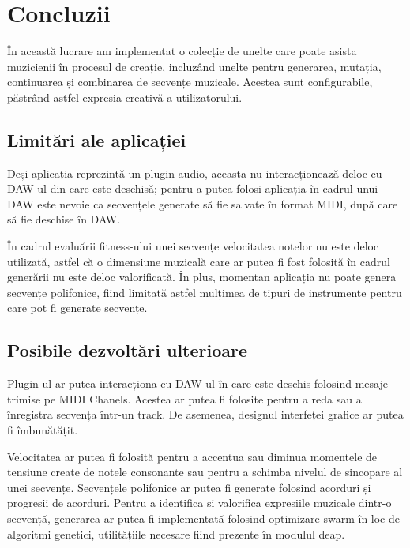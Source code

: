 \section{Concluzii}
\noindent În această lucrare am implementat o colecție de unelte care poate asista muzicienii în procesul de creație, incluzând unelte pentru generarea, mutația, continuarea și combinarea de secvențe muzicale. Acestea sunt configurabile, păstrând astfel expresia creativă a utilizatorului. 
\subsection{Limitări ale aplicației}
\noindent Deși aplicația reprezintă un plugin audio, aceasta nu interacționează deloc cu DAW-ul din care este deschisă; pentru a putea folosi aplicația în cadrul unui DAW este nevoie ca secvențele generate să fie salvate în format MIDI, după care să fie deschise în DAW. \par
În cadrul evaluării fitness-ului unei secvențe velocitatea notelor nu este deloc utilizată, astfel că o dimensiune muzicală care ar putea fi fost folosită în cadrul generării nu este deloc valorificată. În plus, momentan aplicația nu poate genera secvențe polifonice, fiind limitată astfel mulțimea de tipuri de instrumente pentru care pot fi generate secvențe. \par
\subsection{Posibile dezvoltări ulterioare}
\noindent Plugin-ul ar putea interacționa cu DAW-ul în care este deschis folosind mesaje trimise pe MIDI Chanels. Acestea ar putea fi folosite pentru a reda sau a înregistra secvența într-un track. De asemenea, designul interfeței grafice ar putea fi îmbunătățit. \par
Velocitatea ar putea fi folosită pentru a accentua sau diminua momentele de tensiune create de notele consonante sau pentru a schimba nivelul de sincopare al unei secvențe. Secvențele polifonice ar putea fi generate folosind acorduri și progresii de acorduri. Pentru a identifica si valorifica expresiile muzicale dintr-o secvență, generarea ar putea fi implementată folosind optimizare swarm în loc de algoritmi genetici, utilitățiile necesare fiind prezente în modulul deap.
